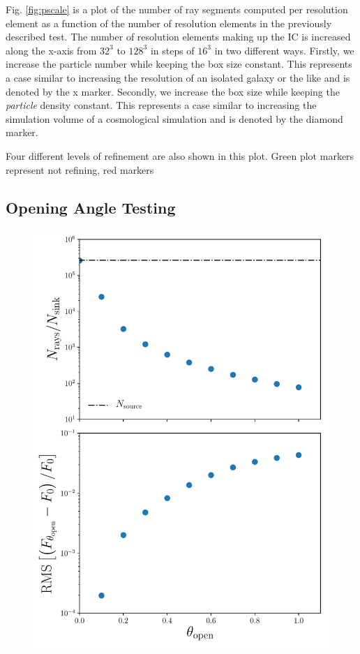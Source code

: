 \documentclass[fleq,usenatbib]{mnras}
\begin{document}
Fig. \ref{fig:pscale} is a plot of the number of ray segments computed per 
resolution element as a function of the number of resolution elements in the 
previously described test. The number of resolution elements making up the IC 
is increased along the x-axis from $32^3$ to $128^3$ in steps of $16^3$ in two 
different ways. Firstly, we increase the particle number while keeping the box 
size constant. This represents a case similar to increasing the resolution of 
an isolated galaxy or the like and is denoted by the x marker. Secondly, we 
increase the box size while keeping the \textit{particle} density constant. 
This represents a case similar to increasing the simulation volume of a 
cosmological simulation and is denoted by the diamond marker. 

Four different levels of refinement are also shown in this plot. Green plot 
markers represent not refining, red markers 



\subsection{Opening Angle Testing}
\begin{figure}
\includegraphics[width=1\linewidth]{Figures/opening_angle.pdf}
\caption{}
\label{fig:openangle}
\end{figure}
\end{document}
